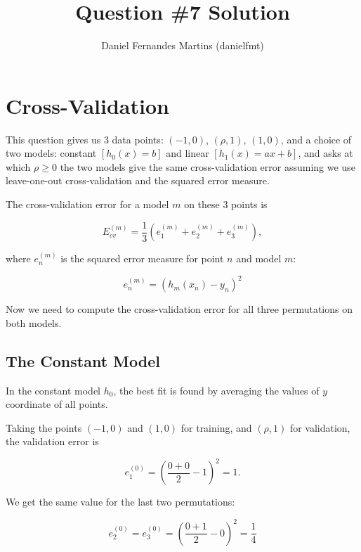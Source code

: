 \documentclass{article}
\author{Daniel Fernandes Martins (danielfmt)}
\title{Question \#7 Solution}
\begin{document}
\maketitle

\section{Cross-Validation}

This question gives us 3 data points: $(-1,0)$, $(\rho,1)$, $(1,0)$, and a choice
of two models: constant $[h_0(x)=b]$ and linear $[h_1(x)=ax+b]$, and asks at
which $\rho \geq 0$ the two models give the same cross-validation error assuming
we use leave-one-out cross-validation and the squared error measure.

The cross-validation error for a model $m$ on these 3 points is

\begin{equation*}
E_{cv}^{(m)}=\frac{1}{3}(e_1^{(m)} + e_2^{(m)} + e_3^{(m)}),
\end{equation*}

where $e_n^{(m)}$ is the squared error measure for point $n$ and model $m$:

\begin{equation*}
e_n^{(m)}=(h_m(x_n)-y_n)^2
\end{equation*}

Now we need to compute the cross-validation error for all three permutations on
both models.

\subsection{The Constant Model}

In the constant model $h_0$, the best fit is found by averaging the values of
$y$ coordinate of all points.

Taking the points $(-1,0)$ and $(1,0)$ for training, and $(\rho,1)$ for validation,
the validation error is

\begin{equation*}
e_1^{(0)} = \left(\frac{0+0}{2} - 1\right)^2 = 1.
\end{equation*}

We get the same value for the last two permutations:

\begin{equation*}
e_2^{(0)} = e_3^{(0)} = \left(\frac{0+1}{2} - 0\right)^2 = \frac{1}{4}
\end{equation*}
\end{document}
